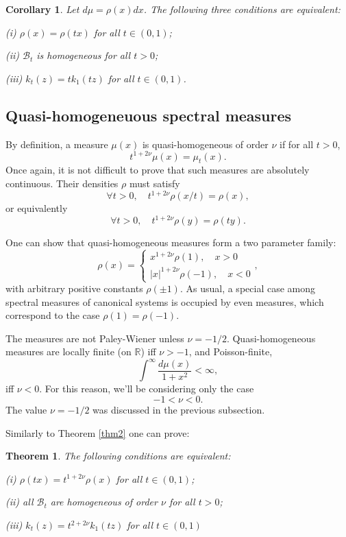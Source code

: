 \documentclass[11pt,twoside,reqno]{amsart}
\def\ms{\bigskip}
\def\ms{\medskip}
\def\no{\noindent}
\def\R{{\mathbb R}}
\def\BB{{\mathcal B}}
\theoremstyle{plain}
\newtheorem{theorem}{Theorem}
\newtheorem{corollary}{Corollary}
\numberwithin{equation}{section}
\begin{document}
\begin{corollary} Let $d\mu=\rho(x)dx$.
The following  three conditions are equivalent:

\ms\no (i) $\rho(x)=\rho(tx)$ for all $t\in (0,1)$;

\ms\no (ii) $\BB_t$ is homogeneous  for all $t>0$;

\ms\no(iii) $k_t(z)=tk_1(tz)$  for all $t\in (0,1)$.

\end{corollary}


\ms\subsection{Quasi-homogeneuous spectral measures} By definition, a measure $\mu(x)$ is quasi-homogeneous of order $\nu$ if
for all $t>0$,
$$t^{1+2\nu}\mu(x)=\mu_t(x).$$
Once again, it is not difficult to prove that such measures are absolutely continuous. Their densities $\rho$ must satisfy
$$\forall t>0,\quad t^{1+2\nu}\rho(x/t)=\rho(x),$$
or equivalently 
$$\forall t>0,\quad t^{1+2\nu}\rho(y)=\rho(ty).$$

One can show that  quasi-homogeneous  measures form a two parameter family:
$$\rho(x)=\begin{cases}x^{1+2\nu}\rho(1),\quad x>0\\
| x|^{1+2\nu}\rho(-1),\quad x<0
\end{cases},$$
with arbitrary positive constants $\rho(\pm 1)$. As usual, a special case among spectral measures of canonical systems is occupied by even measures, which correspond to the case $\rho(1)=\rho(-1)$. 

The measures are not Paley-Wiener unless $\nu=-1/2$.  Quasi-homogeneous measures are locally finite (on $\R$) iff $\nu>-1$, and Poisson-finite,
$$
\int^\infty\frac{d\mu(x)}{1+x^2}<\infty,$$
iff $\nu<0$. For this reason, we'll be considering only the case 
$$-1<\nu<0.$$
The value $\nu=-1/2$ was discussed in the previous subsection.


Similarly to Theorem \ref{thm2}  one can prove:

\begin{theorem}\label{t10}
The following  conditions are equivalent:

\ms\no (i) $\rho(tx)=t^{1+2\nu}\rho(x)$ for all $t\in (0,1)$;

\ms\no (ii) all $\BB_t$ are homogeneous of order $\nu$ for all $t>0$;

\ms\no(iii) $k_t(z)=t^{2+2\nu}k_1(tz)$  for all $t\in (0,1)$

\end{theorem}
\end{document}
